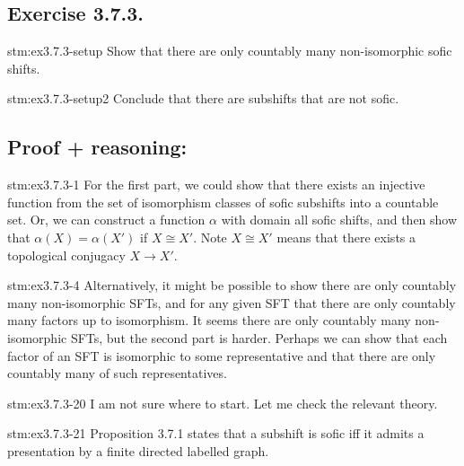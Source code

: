 \subsection*{Exercise 3.7.3.}

\begin{exercise}{stm:ex3.7.3-setup}
Show that there are only countably many non-isomorphic sofic shifts.
\end{exercise}

\begin{exercise}{stm:ex3.7.3-setup2}
Conclude that there are subshifts that are not sofic.
\end{exercise}

\subsection*{Proof {\color{blue}+ reasoning}:}

\begin{explanation}{stm:ex3.7.3-1}
For the first part, we could show that there exists an injective function from the set of isomorphism classes of sofic subshifts into a countable set. Or, we can construct a function $\alpha$ with domain all sofic shifts, and then show that $\alpha(X) = \alpha(X')$ if $X \cong X'$. Note $X \cong X'$ means that there exists a topological conjugacy $X \to X'$.
\end{explanation}

\begin{explanation}{stm:ex3.7.3-4}
Alternatively, it might be possible to show there are only countably many non-isomorphic SFTs, and for any given SFT that there are only countably many factors up to isomorphism. It seems there are only countably many non-isomorphic SFTs, but the second part is harder. Perhaps we can show that each factor of an SFT is isomorphic to some representative and that there are only countably many of such representatives.
\end{explanation}

\begin{explanation}{stm:ex3.7.3-20}
I am not sure where to start. Let me check the relevant theory.
\end{explanation}

\begin{statement}{stm:ex3.7.3-21}
Proposition 3.7.1 states that a subshift is sofic iff it admits a presentation by a finite directed labelled graph.
\end{statement}

